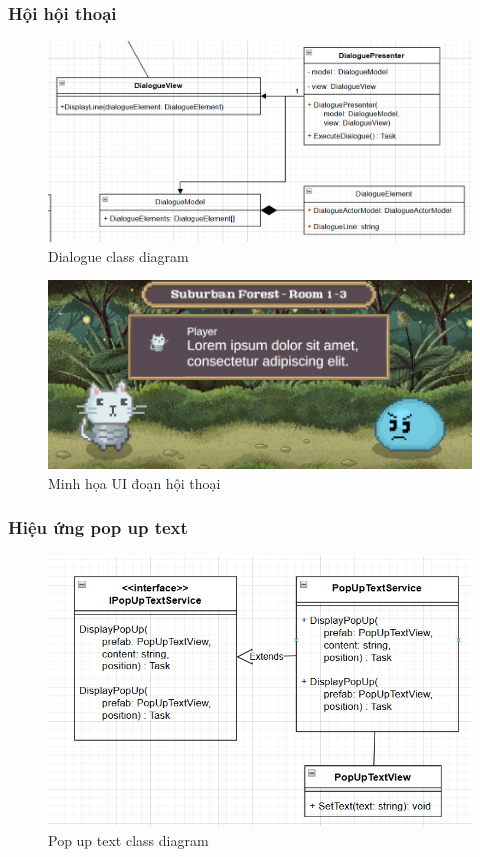 \subsubsection{Hội hội thoại}
\begin{figure}[H]
	\centering
	\includegraphics[width=13cm]{Images/DialogueView.png}
	\vspace{0.5cm}
	\caption{Dialogue class diagram}
\end{figure}

\begin{figure}[H]
	\centering
	\includegraphics[width=13cm]{Images/DialogueUI.png}
	\vspace{0.5cm}
	\caption{Minh họa UI đoạn hội thoại}
\end{figure}

\subsubsection{Hiệu ứng pop up text}
\begin{figure}[H]
	\centering
	\includegraphics[width=13cm]{Images/PopUpText.png}
	\vspace{0.5cm}
	\caption{Pop up text class diagram}
\end{figure}

